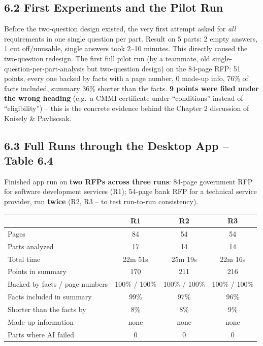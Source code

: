 \documentclass[11pt,a4paper]{article}
\begin{document}
\subsection*{6.2 First Experiments and the Pilot Run}
Before the two-question design existed, the very first attempt asked for \emph{all} requirements in
one single question per part. Result on 5 parts: 2 empty answers, 1 cut off/unusable, single answers
took 2--10 minutes. This directly caused the two-question redesign. The first full pilot run (by a
teammate, old single-question-per-part-analysis but two-question design) on the 84-page RFP: 51
points, every one backed by facts with a page number, 0 made-up info, 76\% of facts included, summary
36\% shorter than the facts. \textbf{9 points were filed under the wrong heading} (e.g.\ a CMMI
certificate under ``conditions'' instead of ``eligibility'') -- this is the concrete evidence behind
the Chapter 2 discussion of Knisely \& Pavliscsak.

\subsection*{6.3 Full Runs through the Desktop App -- Table 6.4}
Finished app run on \textbf{two RFPs across three runs}: 84-page government RFP for software
development services (R1); 54-page bank RFP for a technical service provider, run \textbf{twice} (R2,
R3 -- to test run-to-run consistency).
\begin{center}
\small
\begin{tabular}{@{}lccc@{}}
\toprule
 & \textbf{R1} & \textbf{R2} & \textbf{R3}\\
\midrule
Pages & 84 & 54 & 54\\
Parts analyzed & 17 & 14 & 14\\
Total time & 22m 51s & 25m 19s & 22m 16s\\
Points in summary & 170 & 211 & 216\\
Backed by facts / page numbers & 100\% / 100\% & 100\% / 100\% & 100\% / 100\%\\
Facts included in summary & 99\% & 97\% & 96\%\\
Shorter than the facts by & 8\% & 8\% & 9\%\\
Made-up information & none & none & none\\
Parts where AI failed & 0 & 0 & 0\\
\bottomrule
\end{tabular}
\end{center}
\end{document}
